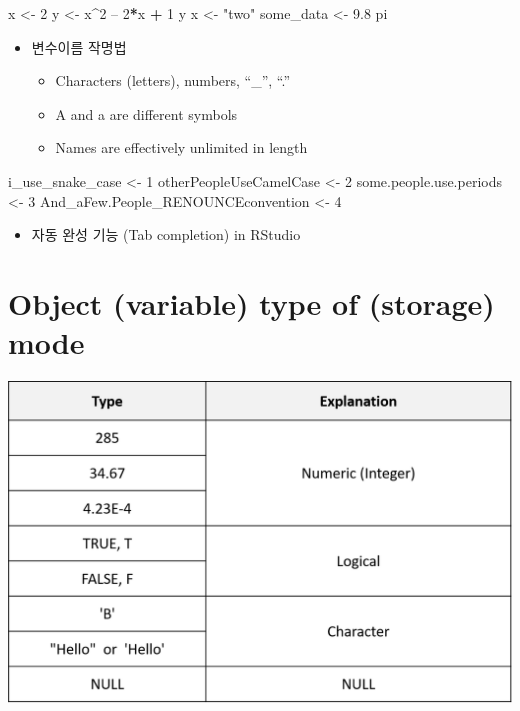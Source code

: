 \documentclass[
]{book}
\newenvironment{Shaded}{\begin{snugshade}}{\end{snugshade}}
\newcommand{\DecValTok}[1]{\textcolor[rgb]{0.00,0.00,0.81}{#1}}
\newcommand{\FloatTok}[1]{\textcolor[rgb]{0.00,0.00,0.81}{#1}}
\newcommand{\NormalTok}[1]{#1}
\newcommand{\OperatorTok}[1]{\textcolor[rgb]{0.81,0.36,0.00}{\textbf{#1}}}
\newcommand{\StringTok}[1]{\textcolor[rgb]{0.31,0.60,0.02}{#1}}
\providecommand{\tightlist}{%
  \setlength{\itemsep}{0pt}\setlength{\parskip}{0pt}}
\begin{document}
\begin{Shaded}
\begin{Highlighting}[]
\NormalTok{x <{-}}\StringTok{ }\DecValTok{2}
\NormalTok{y <{-}}\StringTok{ }\NormalTok{x}\OperatorTok{\^{}}\DecValTok{2}\NormalTok{ – }\DecValTok{2}\OperatorTok{*}\NormalTok{x }\OperatorTok{+}\StringTok{ }\DecValTok{1}
\NormalTok{y}
\NormalTok{x <{-}}\StringTok{ "two"}  
\NormalTok{some\_data <{-}}\StringTok{ }\FloatTok{9.8}
\NormalTok{pi}
\end{Highlighting}
\end{Shaded}

\begin{itemize}
\tightlist
\item
  변수이름 작명법

  \begin{itemize}
  \tightlist
  \item
    Characters (letters), numbers, ``\_'', ``.''
  \item
    A and a are different symbols
  \item
    Names are effectively unlimited in length
  \end{itemize}
\end{itemize}

\begin{Shaded}
\begin{Highlighting}[]
\NormalTok{i\_use\_snake\_case <{-}}\StringTok{ }\DecValTok{1}
\NormalTok{otherPeopleUseCamelCase <{-}}\StringTok{ }\DecValTok{2}
\NormalTok{some.people.use.periods <{-}}\StringTok{ }\DecValTok{3}
\NormalTok{And\_aFew.People\_RENOUNCEconvention <{-}}\StringTok{ }\DecValTok{4}
\end{Highlighting}
\end{Shaded}

\begin{itemize}
\tightlist
\item
  자동 완성 기능 (Tab completion) in RStudio
\end{itemize}

\hypertarget{object-variable-type-of-storage-mode}{%
\section{Object (variable) type of (storage) mode}\label{object-variable-type-of-storage-mode}}

\includegraphics{images/01/01-13.PNG}
\end{document}
